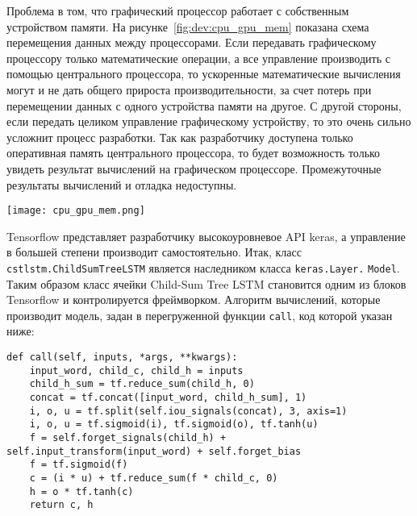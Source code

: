 Проблема в том, что графический процессор работает с собственным устройством памяти. На рисунке~\ref{fig:dev:cpu_gpu_mem} показана схема перемещения данных между процессорами. Если передавать графическому процессору только математические операции, а все управление производить с помощью центрального процессора, то ускоренные математические вычисления могут и не дать общего прироста производительности, за счет потерь при перемещении данных с одного устройства памяти на другое. С другой стороны, если передать целиком управление графическому устройству, то это очень сильно усложнит процесс разработки. Так как разработчику доступена только оперативная память центрального процессора, то будет возможность только увидеть результат вычислений на графическом процессоре. Промежуточные результаты вычислений и отладка недоступны.

\begin{center}
  \texttt{[image: cpu\_gpu\_mem.png]}
  \label{fig:dev:cpu_gpu_mem}
\end{center}

Tensorflow представляет разработчику высокоуровневое API keras, а управление в большей степени производит самостоятельно. Итак, класс \texttt{cst\-lstm.ChildSumTreeLSTM} является наследником класса \texttt{keras.Layer.} \texttt{Model}. Таким образом класс ячейки Child-Sum Tree LSTM становится одним из блоков Tensorflow и контролируется фреймворком. Алгоритм вычислений, которые производит модель, задан в перегруженной функции \texttt{call}, код которой указан ниже:
\medskip
\begin{lstlisting}[style=Python]
  def call(self, inputs, *args, **kwargs):
    input_word, child_c, child_h = inputs
    child_h_sum = tf.reduce_sum(child_h, 0)
    concat = tf.concat([input_word, child_h_sum], 1)
    i, o, u = tf.split(self.iou_signals(concat), 3, axis=1)
    i, o, u = tf.sigmoid(i), tf.sigmoid(o), tf.tanh(u)
    f = self.forget_signals(child_h) + self.input_transform(input_word) + self.forget_bias
    f = tf.sigmoid(f)
    c = (i * u) + tf.reduce_sum(f * child_c, 0)
    h = o * tf.tanh(c)
    return c, h
\end{lstlisting}
\medskip

